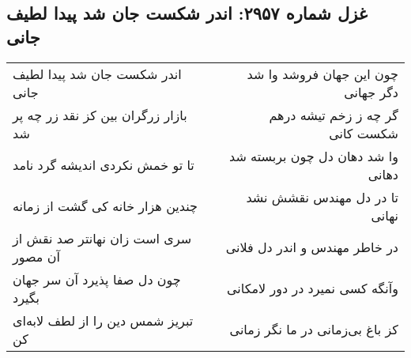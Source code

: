 \begin{center}
\section*{غزل شماره ۲۹۵۷: اندر شکست جان شد پیدا لطیف جانی}
\label{sec:2957}
\begin{longtable}{l p{0.5cm} r}
اندر شکست جان شد پیدا لطیف جانی
&&
چون این جهان فروشد وا شد دگر جهانی
\\
بازار زرگران بین کز نقد زر چه پر شد
&&
گر چه ز زخم تیشه درهم شکست کانی
\\
تا تو خمش نکردی اندیشه گرد نامد
&&
وا شد دهان دل چون بربسته شد دهانی
\\
چندین هزار خانه کی گشت از زمانه
&&
تا در دل مهندس نقشش نشد نهانی
\\
سری است زان نهانتر صد نقش از آن مصور
&&
در خاطر مهندس و اندر دل فلانی
\\
چون دل صفا پذیرد آن سر جهان بگیرد
&&
وآنگه کسی نمیرد در دور لامکانی
\\
تبریز شمس دین را از لطف لابه‌ای کن
&&
کز باغ بی‌زمانی در ما نگر زمانی
\\
\end{longtable}
\end{center}
